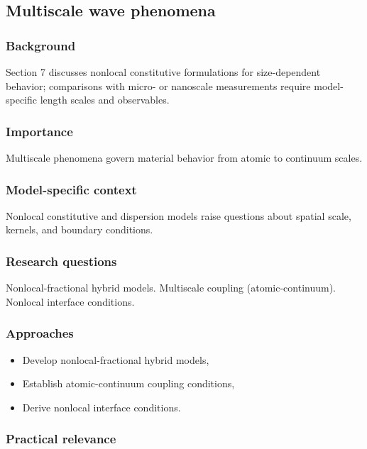 \subsection{Multiscale wave phenomena}
\label{sec:multiscale-waves}

\subsubsection{Background}

Section 7 discusses nonlocal constitutive formulations for size-dependent behavior; comparisons with micro- or nanoscale measurements require model-specific length scales and observables.

\subsubsection{Importance}

Multiscale phenomena govern material behavior from atomic to continuum scales.

\subsubsection{Model-specific context}

Nonlocal constitutive and dispersion models raise questions about spatial scale, kernels, and boundary conditions.

\subsubsection{Research questions}

Nonlocal-fractional hybrid models. Multiscale coupling (atomic-continuum). Nonlocal interface conditions.

\subsubsection{Approaches}

\begin{itemize}
\item Develop nonlocal-fractional hybrid models,
\item Establish atomic-continuum coupling conditions,
\item Derive nonlocal interface conditions.
\end{itemize}

\subsubsection{Practical relevance}

